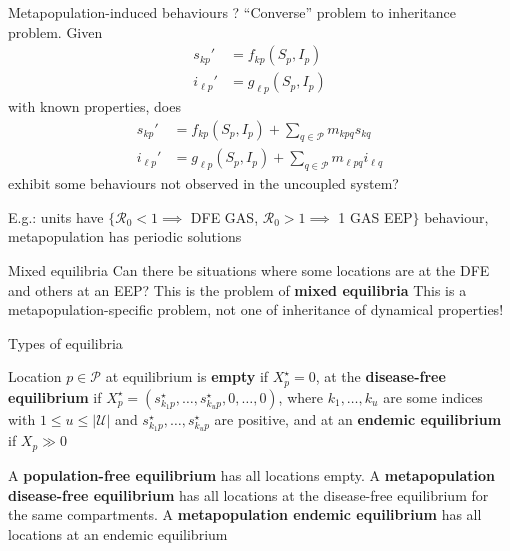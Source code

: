 \documentclass[aspectratio=43]{beamer}
\begin{document}
\begin{frame}{Metapopulation-induced behaviours ?}
	``Converse'' problem to inheritance problem. Given
	\begin{align}
	s_{kp}' &= f_{kp}(S_p,I_p)  \tag{9a} \\
	i_{\ell p}' &= g_{\ell p}(S_p,I_p) \tag{9b}
	\end{align}
	with known properties, does
	\begin{align}
	s_{kp}' &= f_{kp}(S_p,I_p)+\textstyle{\sum_{q\in\mathcal{P}}} m_{kpq}s_{kq}  \tag{10a} \\
	i_{\ell p}' &= g_{\ell p}(S_p,I_p)+\textstyle{\sum_{q\in\mathcal{P}}} m_{\ell pq}i_{\ell q}  \tag{10b}
	\end{align}
	exhibit some behaviours not observed in the uncoupled system?
	
	E.g.: units have $\{\mathcal{R}_0<1\implies$ DFE GAS, $\mathcal{R}_0>1\implies$ 1 GAS EEP$\}$ behaviour, metapopulation has periodic solutions
		
\end{frame}

\begin{frame}{Mixed equilibria}
	Can there be situations where some locations are at the DFE and others at an EEP?
	\vfill
	This is the problem of \textbf{mixed equilibria}
	\vfill
	This is a metapopulation-specific problem, not one of inheritance of dynamical properties!
\end{frame}

\begin{frame}{Types of equilibria}
	\begin{definition}
		Location $p\in\mathcal{P}$ at equilibrium is \textbf{empty} if $X_p^\star=0$, at the \textbf{disease-free equilibrium} if $X_p^\star=(s_{k_1p}^\star,\ldots,s_{k_up}^\star,0,\ldots,0)$, where $k_1,\ldots,k_u$ are some indices with $1\leq u\leq|\mathcal{U}|$ and $s_{k_1p}^\star,\ldots,s_{k_up}^\star$ are positive, and at an \textbf{endemic equilibrium} if $X_p\gg 0$
	\end{definition}
	\vfill
	\begin{definition}
		A \textbf{population-free equilibrium} has all locations empty. A \textbf{metapopulation disease-free equilibrium} has all locations at the disease-free equilibrium for the same compartments. A \textbf{metapopulation endemic equilibrium} has all locations at an endemic equilibrium
	\end{definition}
\end{frame}
\end{document}
